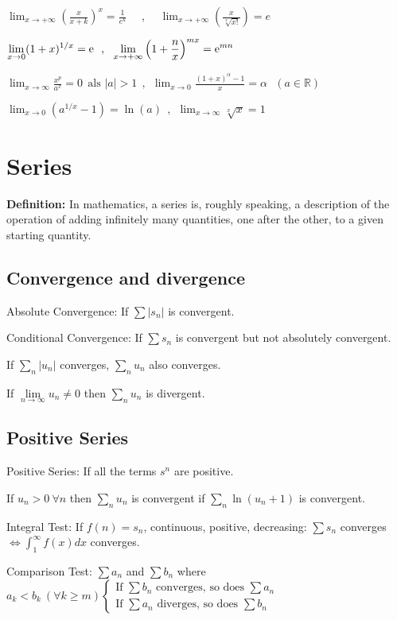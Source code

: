 $ \displaystyle \lim_{x\rightarrow+\infty}\left(\frac{x}{x+k}\right)^x=\frac{1}{e^k} $ \ \ , \ \ 
$ \displaystyle \lim_{x\rightarrow+\infty}\left(\frac{x}{ \sqrt[x]{x!} }\right)=e $

$ \displaystyle
\lim_{x\rightarrow0}(1+x)^{1/x}={\rm e}~~,~~
\lim_{x\rightarrow+\infty}\left(1+\frac{n}{x}\right)^{mx}={\rm e}^{mn}
$

$ \displaystyle
\lim_{x\rightarrow\infty}\frac{x^p}{a^x}=0~~\mbox{als }|a|>1 ~~,~~
\lim_{x\rightarrow0}\frac{(1+x)^\alpha-1}{x}=\alpha ~~~ (a\in\mathbb{R})
$

$ \displaystyle
\lim_{x\rightarrow0}\left(a^{1/x}-1\right)=\ln(a)~~,~~
\lim_{x\rightarrow\infty}\sqrt[x]{x}=1
$

\section{Series}
\textbf{Definition:} In mathematics, a series is, roughly speaking, a description of the operation of adding infinitely many quantities, one after the other, to a given starting quantity.

\subsection{Convergence and divergence}
Absolute Convergence: If $\sum\left|s_n\right|$ is convergent.

Conditional Convergence: If $\sum s_n$ is convergent but not absolutely convergent.

If $\sum\limits_n|u_n|$ converges, $\sum\limits_n u_n$ also converges.

If $\lim\limits_{n\rightarrow\infty}u_n\neq0$ then $\sum\limits_n u_n$ is divergent.

\subsection{Positive Series}
Positive Series: If all the terms $ s^n $ are positive.

If $u_n>0~\forall n$ then $\sum\limits_n u_n$ is convergent if 
$\sum\limits_n\ln(u_n+1)$ is convergent.

Integral Test: If $ f(n) = s_n $, continuous, positive, decreasing: $\sum s_n$ converges $ \Leftrightarrow \int_{1}^{\infty}f(x)dx $ converges.

Comparison Test: $\sum a_n$ and $\sum b_n$ where $a_k<b_k ~ (\forall k\ge m) 
\begin{cases}
\text{If } \sum b_n \text{ converges, so does } \sum a_n \\
\text{If } \sum a_n \text{ diverges, so does } \sum b_n
\end{cases}
$

